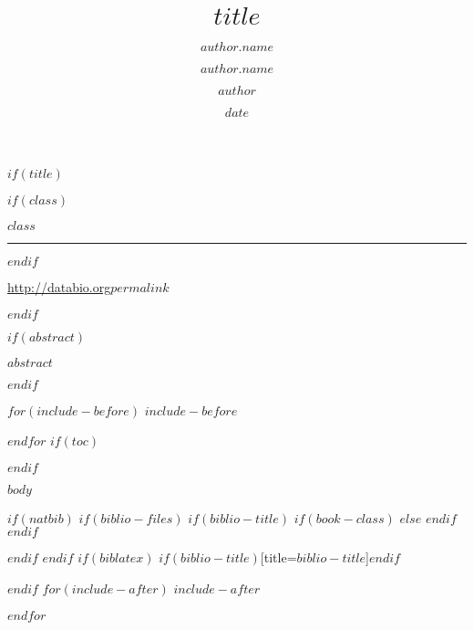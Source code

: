 \documentclass[10pt]{article}
\title{$title$}
\date{$date$}
\author[$author.affiliation$,*]{$author.name$}
\author[$author.affiliation$]{$author.name$}
\author{$author$}
\affil[$institutions.key$]{$institutions.name$}
\affil[*]{Correspondence: \href{mailto:$author.correspondence$}{$author.correspondence$}}
\makeatletter
\renewcommand{\maketitle}{%

$if(class)$
  \begin{flushright}{\huge{\color{graytint}\textbf{\MakeUppercase{$class$}}}}\end{flushright}\vspace{-0.5em}
  {\color{graytint}\hrule}
  $endif$
  \begin{raggedright} 
  \textbf{\huge{\@title}}
        \par \vspace{.5ex}
      {\ignorespaces\@author\newline\href{http://databio.org$permalink$}{http://databio.org$permalink$}\par}
         \vspace{1ex}
        \end{raggedright}            
}
\makeatother
\begin{document}
$if(title)$
\maketitle
$endif$

$if(abstract)$
\begin{infobox}
$abstract$
\end{infobox}
$endif$



$for(include-before)$
$include-before$

$endfor$
$if(toc)$
\tableofcontents

$endif$

\begin{multicols}{2}
$body$
\end{multicols}

$if(natbib)$
$if(biblio-files)$
$if(biblio-title)$
$if(book-class)$
\renewcommand\bibname{$biblio-title$}
$else$
\renewcommand\refname{$biblio-title$}
$endif$
$endif$


$endif$
$endif$
$if(biblatex)$
\printbibliography$if(biblio-title)$[title=$biblio-title$]$endif$

$endif$
$for(include-after)$
$include-after$

$endfor$
\end{document}
